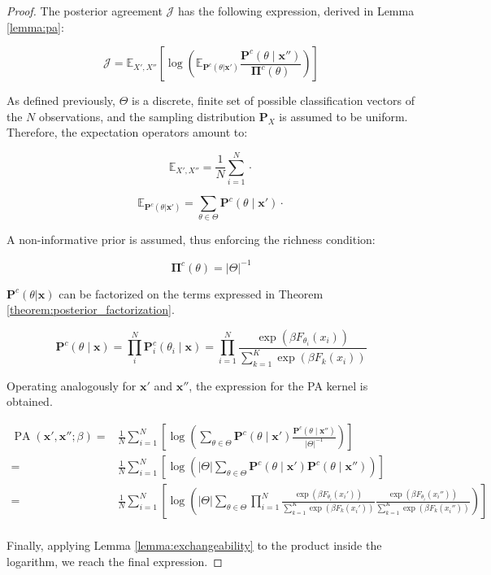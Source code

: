 \begin{proof}
    The posterior agreement $\mathcal{J}$ has the following expression, derived in Lemma \ref{lemma:pa}:

    $$
    \mathcal{J} =\mathbb{E}_{X',X''}\left[\log\left(\mathbb{E}_{\mathbf{P}^c(\theta|\bm{x}')}\frac{\mathbf{P}^c(\theta\mid \bm{x}'')}{\mathbf{\Pi}^c(\theta)}\right)\right]
    $$

    As defined previously, $\Theta$ is a discrete, finite set of possible classification 
    vectors of the $N$ observations, and the sampling distribution $\mathbf{P}_X$ is assumed to be uniform. Therefore, the expectation operators amount to:

    $$
    \mathbb{E}_{X', X''} = \frac{1}{N} \sum_{i=1}^N \cdot
    $$

    $$
    \mathbb{E}_{\mathbf{P}^c(\theta|\bm{x}')} = \sum_{\theta \in \Theta} \mathbf{P}^c(\theta \mid \bm{x}') \cdot
    $$

    A non-informative prior is assumed, thus enforcing the richness condition:

    $$
    \mathbf{\Pi}^c(\theta) = |\Theta|^{-1}
    $$

    $\mathbf{P}^c(\theta|\bm{x})$ can be factorized on the terms expressed in Theorem \ref{theorem:posterior_factorization}.

    $$
    \mathbf{P}^c(\theta \mid \bm{x}) = \prod_i^N  \mathbf{P}_i^c(\theta_i \mid \bm{x}) = \prod_{i=1}^N \frac{\exp\left(\beta F_{\theta_i}(x_i)\right)}{\sum_{k=1}^K\exp\left(\beta F_k(x_i)\right)}
    $$

    Operating analogously for $\bm{x}'$ and $\bm{x}''$, the expression for the PA kernel is obtained.

    $$
    \begin{aligned}
    \operatorname{PA}\left(\bm{x}', \bm{x}'' ; \beta\right) = & \frac{1}{N} \sum_{i=1}^N \left[\log\left(\sum_{\theta \in \Theta} \mathbf{P}^c(\theta \mid \bm{x}') \frac{\mathbf{P}^c(\theta\mid \bm{x}'')}{|\Theta|^{-1}}\right)\right] \\
    = & \frac{1}{N} \sum_{i=1}^N \left[\log\left( |\Theta| \sum_{\theta \in \Theta} \mathbf{P}^c(\theta \mid \bm{x}') \mathbf{P}^c(\theta\mid \bm{x}'')\right)\right] \\
    = & \frac{1}{N} \sum_{i=1}^N \left[\log \left( |\Theta| \sum_{\theta \in \Theta} \prod_{i=1}^N \frac{\exp\left(\beta F_{\theta_i}(x_i')\right)}{\sum_{k=1}^K\exp\left(\beta F_k(x_i')\right)} \frac{\exp\left(\beta F_{\theta_i}(x_i'')\right)}{\sum_{k=1}^K\exp\left(\beta F_k(x_i'')\right)} \right)\right] \\
    \end{aligned}
    $$

    Finally, applying Lemma \ref{lemma:exchangeability} to the product inside the 
    logarithm, we reach the final expression.

\end{proof}

